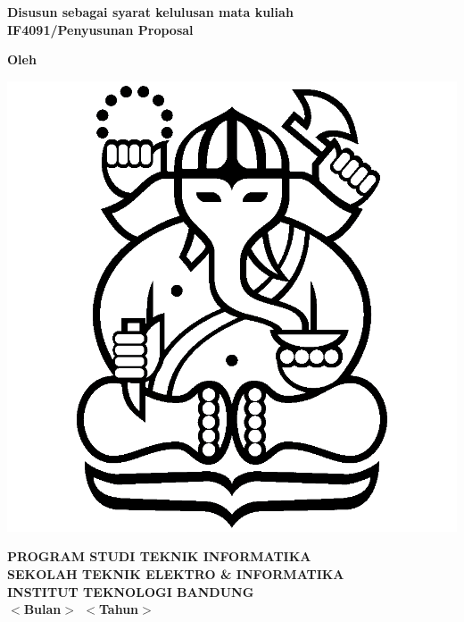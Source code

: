 \pagestyle{empty}
\begin{center}
    \bfseries\large\MakeUppercase{\thetitle}

    \vspace{5em}

    \bfseries\normalsize{Disusun sebagai syarat kelulusan mata kuliah\\ 
    IF4091/Penyusunan Proposal}

    \vspace{5em}
    
    \bfseries{\normalsize{Oleh}\\ \large{\theauthor}}

    \vspace{4.5em}

    \includegraphics[scale=0.1]{images/gajah_itb_transparan_syeilendra.png}

    \vspace{3em}
    \large{\bfseries{\MakeUppercase{Program Studi Teknik Informatika\\
        Sekolah Teknik Elektro \& Informatika\\
        Institut Teknologi Bandung}\\$<$Bulan$>$ $<$Tahun$>$}}
    
\end{center}
\clearpage